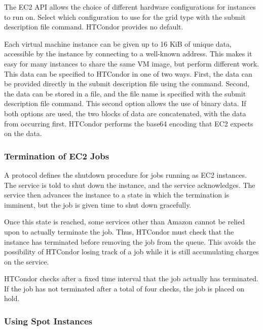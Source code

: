 The EC2 API allows the choice of different hardware configurations 
for instances to run on.
Select which configuration to use for the  grid type
with the  submit description file command.
HTCondor provides no default.

Each virtual machine instance can be given up to 16 KiB of unique data, 
accessible by the instance by connecting to a well-known address.
This makes it easy for many instances to share the same VM image,
but perform different work.
This data can be specified to HTCondor in one of two ways.
First, the data can be provided directly in the submit description file 
using the  command.
Second, the data can be
stored in a file, and the file name is specified with the
 submit description file command.
This second option allows the use of binary data.
If both options are used, the two blocks of
data are concatenated, with the data from  
occurring first.  HTCondor performs the base64 encoding that EC2 expects on 
the data.

\subsubsection{\label{sec:EC2-termination}Termination of EC2 Jobs}

A protocol defines the shutdown procedure for jobs running as
EC2 instances.
The service is told to shut down the instance,
and the service acknowledges.
The service then advances the instance to a state in which
the termination is imminent, but the job is given time to
shut down gracefully.

Once this state is reached, some services other than Amazon cannot be
relied upon to actually terminate the job.
Thus, HTCondor must check that the instance has terminated
before removing the job from the queue.
This avoids the possibility of HTCondor losing track of a job
while it is still accumulating charges on the service.  

HTCondor checks after a fixed time interval
that the job actually has terminated.
If the job has not terminated after a total of four checks,
the job is placed on hold.

\subsubsection{\label{sec:spot-instances}Using Spot Instances}

